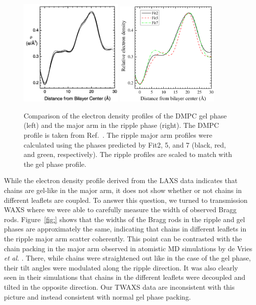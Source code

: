 \begin{figure}[htbp]
  \centering
  \includegraphics[width=0.45\textwidth]{figures/ripple/discussion/Tristram-Nagle_gel_DMPC}
  \includegraphics[width=0.45\textwidth]{figures/ripple/discussion/major_edp}
  \caption{Comparison of the electron density profiles of the DMPC gel phase (left)
  and the major arm in the ripple phase (right). The DMPC profile is taken from 
  Ref.~\cite{Tristram-Nagle02}. The ripple major arm profiles were calculated 
  using the phases predicted by Fit2, 5, and 7 (black, red, and green, respectively). 
  The ripple profiles are scaled to match 
  with the gel phase profile.}
  \label{fig:gel_comparison}
\end{figure}

While the electron density profile derived from the LAXS data indicates that 
chains are gel-like in the major arm, it does not show whether or not chains 
in different leaflets are coupled. To answer this question, we turned to
transmission WAXS where we were able to carefully measure the width of 
observed Bragg rods. Figure~\ref{fig:} shows that the widths of the Bragg
rods in the ripple and gel phases are approximately the same, indicating that
chains in different leaflets in the ripple major arm scatter coherently.
This point can be contrasted with the chain packing in the major arm
observed in atomistic MD simulations by de Vries \textit{et al.} \cite{ref:deVries05}.
There, while chains were straightened out like in the case of the gel phase,
their tilt angles were modulated along the ripple direction. It was also
clearly seen in their simulations that chains in the different leaflets were 
decoupled and tilted in the opposite direction. Our TWAXS data are 
inconsistent with this picture and instead consistent with normal
gel phase packing.

